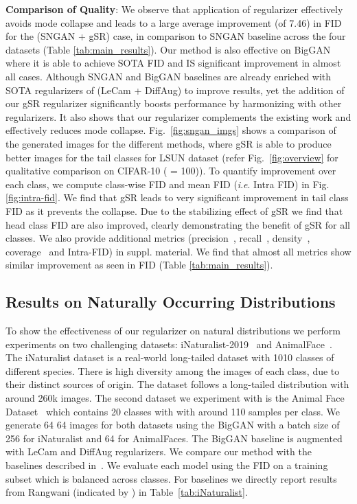 \documentclass[runningheads,table]{llncs}
\newcommand{\ie}{\textit{i}.\textit{e}. }
\begin{document}
\noindent\textbf{Comparison of Quality}: We observe that application of regularizer effectively avoids mode collapse and leads to a large average improvement (of 7.46) in FID for the (SNGAN + gSR) case, in comparison to SNGAN baseline across the four datasets (Table \ref{tab:main_results}). Our method is also effective on BigGAN where it is able to achieve SOTA FID and IS significant improvement in almost all cases. Although SNGAN and BigGAN baselines are already enriched with SOTA regularizers of (LeCam + DiffAug) to improve results, yet the addition of our gSR regularizer significantly boosts performance by harmonizing with other regularizers. It also shows that our regularizer complements the existing work and effectively reduces mode collapse. Fig.~\ref{fig:sngan_imgs} shows a comparison of the generated images for the different methods, where gSR is able to produce better images for the tail classes for LSUN dataset (refer Fig.~\ref{fig:overview} for qualitative comparison on CIFAR-10 ( = 100)). To quantify improvement over each class, we compute class-wise FID and mean FID (\ie Intra FID) in Fig. \ref{fig:intra-fid}. We find that gSR leads to very significant improvement in tail class FID as it prevents the collapse. Due to the stabilizing effect of gSR we find that head class FID are also improved, clearly demonstrating the benefit of gSR for all classes. We also provide additional metrics (precision~\cite{kynkaanniemi2019improved}, recall~\cite{kynkaanniemi2019improved}, density~\cite{ferjad2020icml}, coverage~\cite{ferjad2020icml} and Intra-FID) in suppl. material. We find that almost all metrics show similar improvement as seen in FID (Table \ref{tab:main_results}). 






\subsection{Results on Naturally Occurring Distributions}
\label{sec:natural_dist_results}
To show the effectiveness of our regularizer on natural distributions we perform experiments on two challenging datasets: iNaturalist-2019~\cite{inat19} and AnimalFace~\cite{si2011learning}. The iNaturalist dataset is a real-world long-tailed dataset with 1010 
classes of different species. There is high diversity among the images of each class, due to their distinct sources of origin. The dataset follows a long-tailed distribution with around 260k images. The second dataset we experiment with is the Animal Face Dataset~\cite{kolouri2016sliced} which contains 20 classes with with around 110 samples per class. We generate 64  64 images for both datasets using the BigGAN with a batch size of 256 for iNaturalist and 64 for AnimalFaces. The BigGAN baseline is augmented with LeCam and DiffAug regularizers. We compare our method with the baselines described in~\cite{rangwani2021class}. We evaluate each model using the FID on a training subset which is balanced across classes. For baselines we directly report results from Rangwani \etal \cite{rangwani2021class} (indicated by ) in 
Table~\ref{tab:iNaturalist}.
\end{document}
